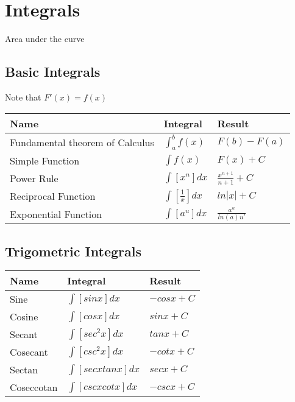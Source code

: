 \documentclass[17pt]{extarticle}
\begin{document}
\section{Integrals}
Area under the curve
\subsection{Basic Integrals}
Note that $F\prime(x)=f(x)$
\renewcommand{\arraystretch}{2}
\begin{table}[H]
\begin{tabular}{|l|l|l|}
\hline
\rowcolor{githublightgray}
Name & Integral & Result\\
\hline
Fundamental theorem of Calculus&$\int_{a}^{b}f(x)$&$F(b)-F(a)$\\
\hline
Simple Function & $\int f(x)$&$F(x)+C$\\
\hline
Power Rule & $\int [x^n]dx$&$\frac{x^{n+1}}{n+1}+C$\\
\hline
Reciprocal Function & $\int [\frac{1}{x}]dx$&$ln|x|+C$\\
\hline
Exponential Function & $\int [a^u]dx$&$\frac{a^u}{ln(a)u\prime}$\\
\hline
\end{tabular}
\end{table}

\subsection{Trigometric Integrals}
\renewcommand{\arraystretch}{2}
\begin{table}[H]
\begin{tabular}{|l|l|l|}
\hline
\rowcolor{githublightgray}
Name & Integral & Result\\
\hline
Sine & $\int[sinx]dx$ & $-cosx+C$\\
\hline
Cosine &$\int[cosx]dx$ & $sinx+C$\\
\hline
Secant &$\int[sec^2x]dx$&$tanx+C$\\
\hline
Cosecant &$\int[csc^2x]dx$&$-cotx+C$\\
\hline
Sectan &$\int[secxtanx]dx$&$secx+C$\\
\hline
Coseccotan&$\int[cscxcotx]dx$&$-cscx+C$\\
\hline
\end{tabular}
\end{table}
\end{document}
